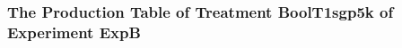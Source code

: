  \begin{frame}
 \fontsize{8pt}{9pt}\selectfont
 \frametitle{ The Production Table of Treatment BoolT1sgp5k of Experiment ExpB }

 \label{ExpBGrammarTable008.tex}  
 \end{frame}

